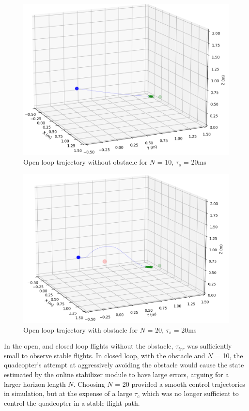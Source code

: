 \documentclass[conference]{IEEEtran}
\begin{document}
\begin{figure}[htbp]
	\centerline{\includegraphics[scale = 0.4]{figures/Screenshot_OL_ST.png} }
	\caption{Open loop trajectory without obstacle for $N$ = 10, $\tau_s$ = 20ms}
	\label{Fig3}
\end{figure}

\begin{figure}[htbp]
	\centerline{\includegraphics[scale = 0.4]{figures/Screenshot_OLwO_ST.png} }
	\caption{Open loop trajectory with obstacle for $N$ = 20, $\tau_s$ = 20ms}
	\label{Fig4}
\end{figure} 


In the open, and closed loop flights without the obstacle, $\tau_{trr}$ was sufficiently small to observe stable flights. In closed loop, with the obstacle and $N$ = 10, the quadcopter's attempt at aggressively avoiding the obstacle would cause the state estimated by the online stabilizer module to have large errors, arguing for a larger horizon length $N$. Choosing $N$ = 20 provided a smooth control trajectories in simulation, but at the expense of a large $\tau_{c}$ which was no longer sufficient to control the quadcopter in a stable flight path. 
\end{document}
